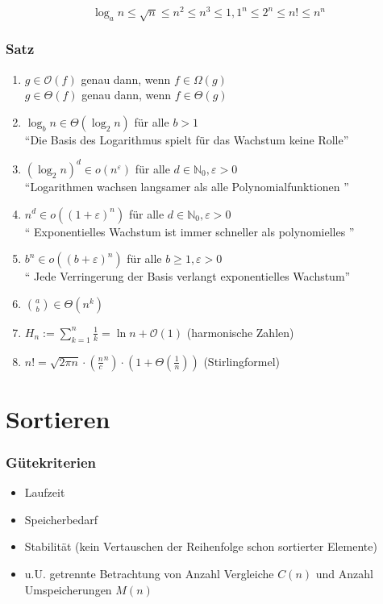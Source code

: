 \documentclass{scrartcl}
\begin{document}
\begin{shaded}
\[ \log_a{n} \leq \sqrt{n} \leq n^2 \leq n^3 \leq 1,1^n \leq 2^n \leq n! \leq n^n\]
\end{shaded}

\subsubsection{Satz}
\begin{enumerate}
	\item $g \in \mathcal{O}(f) $ genau dann, wenn $f \in \Omega(g) $
	\\ $g \in \Theta(f) $ genau dann, wenn $f \in \Theta(g) $
	\item $\log_b{n} \in \Theta (\log_2{n}) $ für alle $b>1$ \\
	"`Die Basis des Logarithmus spielt für das Wachstum keine Rolle"'
	\item $ (\log_2{n})^d \in o(n^\varepsilon) $ für alle $d \in \mathds{N}_0, \varepsilon>0$\\
	"`Logarithmen wachsen langsamer als alle Polynomialfunktionen "'
	\item $ n^d \in o((1+\varepsilon)^n) $ für alle $d\in \mathds{N}_0, \varepsilon>0$\\
	"` Exponentielles Wachstum ist immer schneller als polynomielles "'
	\item $ b^n \in o((b+\varepsilon)^n) $ für alle $b\geq 1, \varepsilon>0$ \\
	"` Jede Verringerung der Basis verlangt exponentielles Wachstum"'
	\item $ \binom{a}{b} \in \Theta(n^k)$
	\item $H_n := \sum^n_{k=1} \frac{1}{k} = \ln n + \mathcal{O}(1)$ {\tiny (harmonische Zahlen)}
	\item $n! = \sqrt{2\pi n} \cdot \left( \frac{n}{c}^n \right) \cdot \left( 1+\Theta \left( \frac{1}{n} \right) \right)$ {\tiny (Stirlingformel)}
\end{enumerate}

\section{Sortieren}
\subsubsection{Gütekriterien}
\begin{itemize}
	\item Laufzeit
	\item Speicherbedarf
	\item Stabilität (kein Vertauschen der Reihenfolge schon sortierter Elemente)
	\item u.U. getrennte Betrachtung von Anzahl Vergleiche $C(n)$ und Anzahl Umspeicherungen $M(n)$
\end{itemize}
\end{document}
